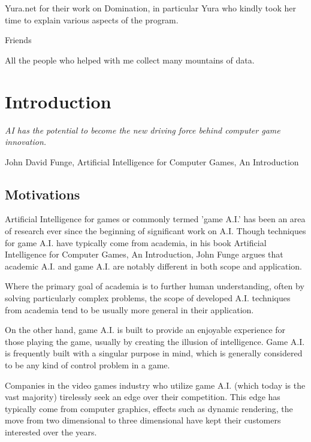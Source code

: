 \documentclass[parskip]{cs4rep}
\begin{document}
Yura.net for their work on Domination, in particular Yura who kindly took her time to explain various aspects of the program.

Friends 

All the people who helped with me collect many mountains of data.

\tableofcontents


\chapter{Introduction}

\begin{flushleft}
\textit{AI has the potential to become the new driving force behind computer game innovation.}
\end{flushleft}
\begin{flushleft}
John David Funge, Artificial Intelligence for Computer Games, An Introduction
\end{flushleft}

\section{Motivations}

Artificial Intelligence for games or commonly termed 'game A.I.' has been an area of research ever since the beginning of significant work on A.I. Though techniques for game A.I. have typically come from academia, in his book Artificial Intelligence for Computer Games, An Introduction, John Funge argues \cite{JohnFunge:AIForComp} that academic A.I. and game A.I. are notably different in both scope and application.

Where the primary goal of academia is to further human understanding, often by solving particularly complex problems, the scope of developed A.I. techniques from academia tend to be usually more general in their application.

On the other hand, game A.I. is built to provide an enjoyable experience for those playing the game, usually by creating the illusion of intelligence. Game A.I. is frequently built with a singular purpose in mind, which is generally considered to be any kind of control problem in a game.

Companies in the video games industry who utilize game A.I. (which today is the vast majority) tirelessly seek an edge over their competition. This edge has typically come from computer graphics, effects such as dynamic rendering, the move from two dimensional to three dimensional have kept their customers interested over the years. 
\end{document}
